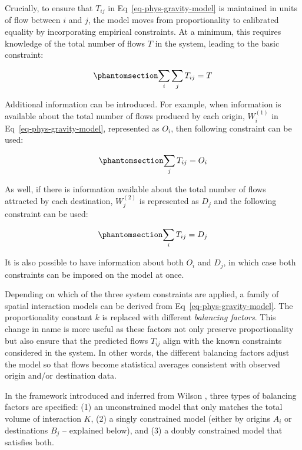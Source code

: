 \documentclass[
  10pt,
  letterpaper,
]{article}
\begin{document}
Crucially, to ensure that \(T_{ij}\) in Eq~\ref{eq-phys-gravity-model}
is maintained in units of flow between \(i\) and \(j\), the model moves
from proportionality to calibrated equality by incorporating empirical
constraints. At a minimum, this requires knowledge of the total number
of flows \(T\) in the system, leading to the basic constraint:

\begin{equation}\phantomsection\label{eq-constraint0-gravitymodel}{
\sum_i\sum_j T_{ij} = T
}\end{equation}

Additional information can be introduced. For example, when information
is available about the total number of flows produced by each origin,
\(W_i^{(1)}\) in Eq~\ref{eq-phys-gravity-model}, represented as \(O_i\),
then following constraint can be used:

\begin{equation}\phantomsection\label{eq-constraint1-gravitymodel}{
\sum_j T_{ij} = O_i
}\end{equation}

As well, if there is information available about the total number of
flows attracted by each destination, \(W_j^{(2)}\) is represented as
\(D_j\) and the following constraint can be used:

\begin{equation}\phantomsection\label{eq-constraint2-gravitymodel}{
\sum_i T_{ij} = D_j
}\end{equation}

It is also possible to have information about both \(O_i\) and \(D_j\),
in which case both constraints can be imposed on the model at once.

Depending on which of the three system constraints are applied, a family
of spatial interaction models can be derived from
Eq~\ref{eq-phys-gravity-model}. The proportionality constant \(k\) is
replaced with different \emph{balancing factors}. This change in name is
more useful as these factors not only preserve proportionality but also
ensure that the predicted flows \(T_{ij}\) align with the known
constraints considered in the system. In other words, the different
balancing factors adjust the model so that flows become statistical
averages consistent with observed origin and/or destination data.

In the framework introduced and inferred from Wilson \citep{wilson1971},
three types of balancing factors are specified: (1) an unconstrained
model that only matches the total volume of interaction \(K\), (2) a
singly constrained model (either by origins \(A_i\) or destinations
\(B_j\) -- explained below), and (3) a doubly constrained model that
satisfies both.
\end{document}
